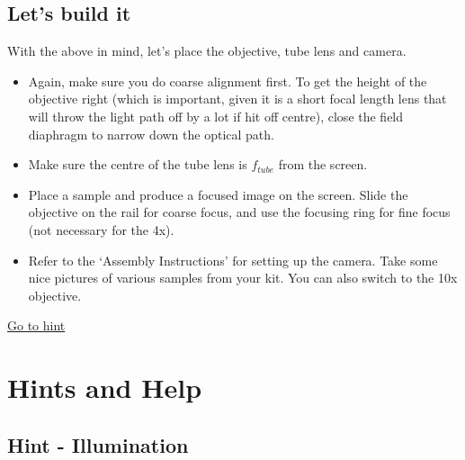 \documentclass[a4paper]{report}
\begin{document}
   \subsection{Let's build it}
   With the above in mind, let's place the objective, tube lens and camera.
   \begin{itemize}
       \item Again, make sure you do coarse alignment first. To get the height of the objective right (which is important, given it is a short focal length lens that will throw the light path off by a lot if hit off centre), close the field diaphragm to narrow down the optical path.
       \item Make sure the centre of the tube lens is $f_{tube}$ from the screen.
       \item Place a sample and produce a focused image on the screen. Slide the objective on the rail for coarse focus, and use the focusing ring for fine focus (not necessary for the 4x).
       \item Refer to the `Assembly Instructions' for setting up the camera. Take some nice pictures of various samples from your kit. You can also switch to the 10x objective.
   \end{itemize}
   \noindent
\hyperlink{hintTo-imaging}{Go to hint}
\clearpage
\section{Hints and Help}
   \subsection{Hint - Illumination}
\hypertarget{hintTo-illumination}{}
\end{document}
